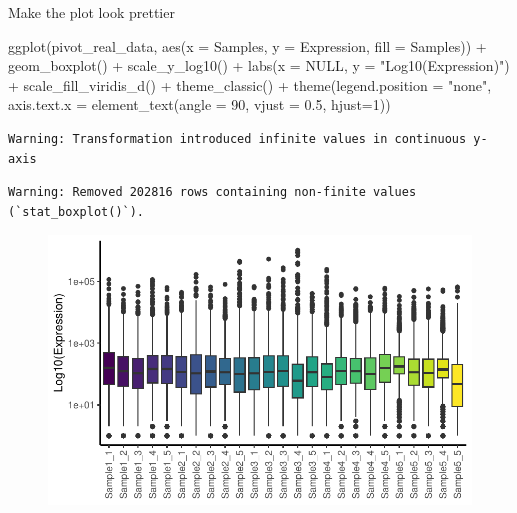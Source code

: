 \documentclass[
  letterpaper,
  DIV=11,
  numbers=noendperiod,
  landscape]{scrartcl}
\newenvironment{Shaded}{\begin{snugshade}}{\end{snugshade}}
\newcommand{\AttributeTok}[1]{\textcolor[rgb]{0.40,0.45,0.13}{#1}}
\newcommand{\ConstantTok}[1]{\textcolor[rgb]{0.56,0.35,0.01}{#1}}
\newcommand{\DecValTok}[1]{\textcolor[rgb]{0.68,0.00,0.00}{#1}}
\newcommand{\FloatTok}[1]{\textcolor[rgb]{0.68,0.00,0.00}{#1}}
\newcommand{\FunctionTok}[1]{\textcolor[rgb]{0.28,0.35,0.67}{#1}}
\newcommand{\NormalTok}[1]{\textcolor[rgb]{0.00,0.23,0.31}{#1}}
\newcommand{\SpecialCharTok}[1]{\textcolor[rgb]{0.37,0.37,0.37}{#1}}
\newcommand{\StringTok}[1]{\textcolor[rgb]{0.13,0.47,0.30}{#1}}
\begin{document}
Make the plot look prettier

\begin{Shaded}
\begin{Highlighting}[numbers=left,,]
\FunctionTok{ggplot}\NormalTok{(pivot\_real\_data, }\FunctionTok{aes}\NormalTok{(}\AttributeTok{x =}\NormalTok{ Samples, }\AttributeTok{y =}\NormalTok{ Expression, }\AttributeTok{fill =}\NormalTok{ Samples)) }\SpecialCharTok{+}
  \FunctionTok{geom\_boxplot}\NormalTok{() }\SpecialCharTok{+}
  \FunctionTok{scale\_y\_log10}\NormalTok{() }\SpecialCharTok{+}
  \FunctionTok{labs}\NormalTok{(}\AttributeTok{x =} \ConstantTok{NULL}\NormalTok{,}
       \AttributeTok{y =} \StringTok{"Log10(Expression)"}\NormalTok{) }\SpecialCharTok{+}
  \FunctionTok{scale\_fill\_viridis\_d}\NormalTok{() }\SpecialCharTok{+}
  \FunctionTok{theme\_classic}\NormalTok{() }\SpecialCharTok{+}
  \FunctionTok{theme}\NormalTok{(}\AttributeTok{legend.position =} \StringTok{"none"}\NormalTok{,}
        \AttributeTok{axis.text.x =} \FunctionTok{element\_text}\NormalTok{(}\AttributeTok{angle =} \DecValTok{90}\NormalTok{, }\AttributeTok{vjust =} \FloatTok{0.5}\NormalTok{, }\AttributeTok{hjust=}\DecValTok{1}\NormalTok{))}
\end{Highlighting}
\end{Shaded}

\begin{verbatim}
Warning: Transformation introduced infinite values in continuous y-axis
\end{verbatim}

\begin{verbatim}
Warning: Removed 202816 rows containing non-finite values (`stat_boxplot()`).
\end{verbatim}

\begin{figure}[H]

{\centering \includegraphics{RandRStudio_files/figure-pdf/unnamed-chunk-27-1.pdf}

}

\end{figure}
\end{document}
